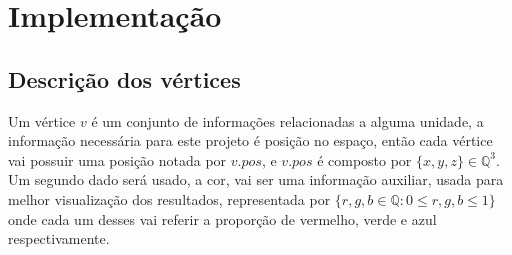 

\chapter{Implementação}



\section{Descrição dos vértices}
Um vértice $v$ é um conjunto de informações relacionadas a alguma unidade, %
a informação necessária para este projeto é posição no espaço, então cada vértice
vai possuir uma posição notada por $v.pos$, e $v.pos$ é composto por 
$\{x, y, z\} \in \mathbb{Q}^3$. Um segundo dado será usado, a cor, vai ser uma 
informação auxiliar, usada para melhor visualização dos resultados, 
representada por $\{r, g, b \in \mathbb{Q}:0 \leq r, g, b \leq 1\}$ onde cada um desses
vai referir a proporção de vermelho, verde e azul respectivamente.


